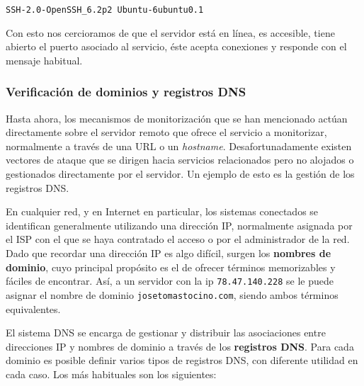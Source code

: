 \begin{verbatim}
SSH-2.0-OpenSSH_6.2p2 Ubuntu-6ubuntu0.1
\end{verbatim}

Con esto nos cercioramos de que el servidor está en línea, es accesible, tiene
abierto el puerto asociado al servicio, éste acepta conexiones y responde con el
mensaje habitual.

\subsubsection{Verificación de dominios y registros DNS}

Hasta ahora, los mecanismos de monitorización que se han mencionado actúan
directamente sobre el servidor remoto que ofrece el servicio a monitorizar,
normalmente a través de una \ac{URL} o un \textit{hostname}. Desafortunadamente
existen vectores de ataque que se dirigen hacia servicios relacionados pero no
alojados o gestionados directamente por el servidor. Un ejemplo de esto es la
gestión de los registros \ac{DNS}.

En cualquier red, y en Internet en particular, los sistemas conectados se
identifican generalmente utilizando una dirección \ac{IP}, normalmente asignada
por el \ac{ISP} con el que se haya contratado el acceso o por el administrador
de la red. Dado que recordar una dirección IP es algo difícil, surgen los
\textbf{nombres de dominio}, cuyo principal propósito es el de ofrecer términos
memorizables y fáciles de encontrar. Así, a un servidor con la ip
\texttt{78.47.140.228} se le puede asignar el nombre de dominio
\texttt{josetomastocino.com}, siendo ambos términos equivalentes.

El sistema \ac{DNS} se encarga de gestionar y distribuir las asociaciones entre
direcciones IP y nombres de dominio a través de los \textbf{registros DNS}. Para
cada dominio es posible definir varios tipos de registros DNS, con diferente
utilidad en cada caso. Los más habituales son los siguientes:

